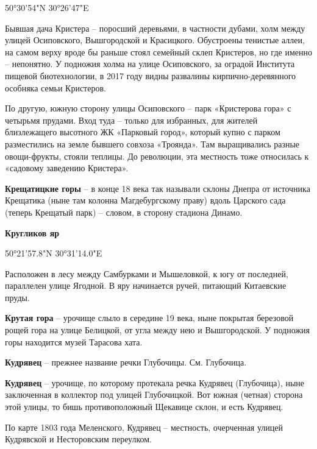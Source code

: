 50°30'54"N 30°26'47"E

Бывшая дача Кристера – поросший деревьями, в частности дубами, холм между улицей Осиповского, Вышгородской и Красицкого. Обустроены тенистые аллеи, на самом верху вроде бы раньше стоял семейный склеп Кристеров, но где именно – непонятно. У подножия холма на улице Осиповского, за оградой Института пищевой биотехнологии, в 2017 году видны развалины кирпично-деревянного особняка семьи Кристеров.

По другую, южную сторону улицы Осиповского – парк «Кристерова гора» с четырьмя прудами. Вход туда – только для избранных, для жителей близлежащего высотного ЖК «Парковый город», который купно с парком разместились на земле бывшего совхоза «Троянда». Там выращивались разные овощи-фрукты, стояли теплицы. До революции, эта местность тоже относилась к «садовому заведению Кристера».\\


\medskip

\textbf{Крещатицкие горы} – в конце 18 века так называли склоны Днепра от источника Крещатика (ныне там колонна Магдебургскому праву) вдоль Царского сада (теперь Крещатый парк) – словом, в сторону стадиона Динамо.\\

\medskip

\textbf{Кругликов яр} 

50°21'57.8"N 30°31'14.0"E

Расположен в лесу между Самбурками и Мышеловкой, к югу от последней, параллелен улице Ягодной. В яру начинается ручей, питающий Китаевские пруды.\\

\medskip

\textbf{Крутая гора} – урочище слыло в середине 19 века, ныне покрытая березовой рощей гора на улице Белицкой, от угла между нею и Вышгородской. У подножия горы находится музей Тарасова хата.\\

\medskip

\textbf{Кудрявец} – прежнее название речки Глубочицы. См. Глубочица.\\


\medskip

\textbf{Кудрявец} – урочище, по которому протекала речка Кудрявец (Глубочица), ныне заключенная в коллектор под улицей Глубочицкой. Вот южная (четная) сторона этой улицы, то бишь противоположный Щекавице склон, и есть Кудрявец.

По карте 1803 года Меленского, Кудрявец – местность, очерченная улицей Кудрявской и Несторовским переулком.\\

